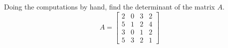 Doing the computations by hand, find the determinant of the matrix $A$. 
%
\begin{equation*}
A=
\begin{bmatrix}
 2 & 0 & 3 & 2 \\
 5 & 1 & 2 & 4 \\
 3 & 0 & 1 & 2 \\
 5 & 3 & 2 & 1
\end{bmatrix}
\end{equation*}